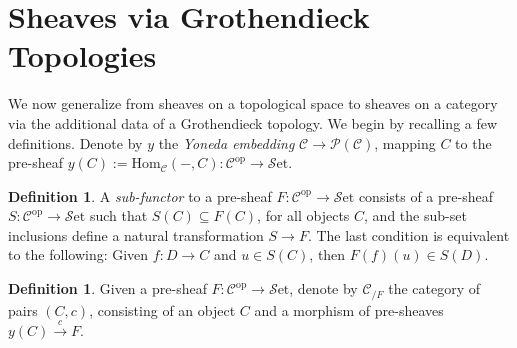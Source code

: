 \documentclass[a4paper]{book}
\newcommand{\lC}{\mathcal{C}}
\newcommand{\lP}{\mathcal{P}}
\newcommand{\lS}{\mathcal{S}}
\newcommand{\op}{\mathrm{op}}
\newcommand{\set}{\lS\mathrm{et}} %
\renewcommand{\hom}{\mathrm{Hom}} %
\theoremstyle{definition}
\newtheorem{definition}[equation]{Definition}
\theoremstyle{remark}
\numberwithin{equation}{section}
\begin{document}
	\section{Sheaves via Grothendieck Topologies}
	
	We now generalize from sheaves on a topological space to sheaves on a category via the additional data of a Grothendieck topology. We begin by recalling a few definitions. Denote by $y$ the \textit{Yoneda embedding} $\lC\to\lP(\lC)$, mapping $C$ to the pre-sheaf $y(C):=\hom_\lC(-,C)\colon\lC^{\op}\to\set$. 
	\begin{definition}
		A \emph{sub-functor} to a pre-sheaf $F\colon\lC^{\op}\to\set$ consists of a pre-sheaf $S:\lC^{\op}\to\set$ such that $S(C)\subseteq F(C)$, for all objects $C$, and the sub-set inclusions define a natural transformation $S\to F$. The last condition is equivalent to the following: Given $f\colon D\to C$ and $u\in S(C)$, then $F(f)(u)\in S(D)$. 
	\end{definition}
	\begin{definition}
		Given a pre-sheaf $F\colon\lC^{\op}\to\set$, denote by $\lC_{/F}$ the category of pairs $(C,c)$, consisting of an object $C$ and a morphism of pre-sheaves $y(C)\xrightarrow{c} F$.
	\end{definition}
	
\end{document}
